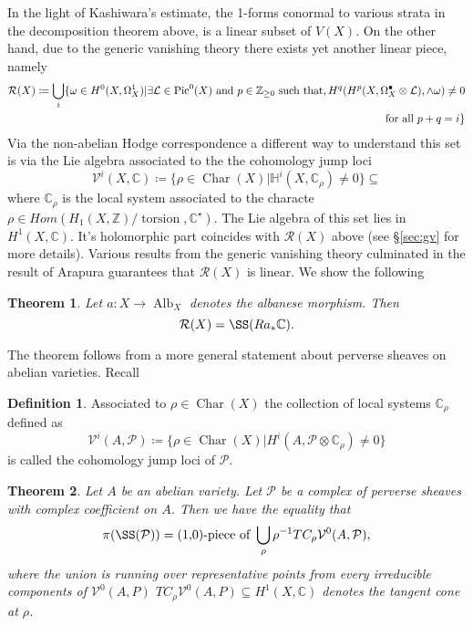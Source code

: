 \documentclass[12pt,reqno]{amsart}
\newtheorem{alphtheorem}{Theorem}
\theoremstyle{question}
\theoremstyle{definition}
\newtheorem{definition}[theorem]{Definition}
\theoremstyle{remark}
\theoremstyle{cited}
\theoremstyle{citeddef}
\DeclareMathOperator{\Alb}{Alb}
\DeclareMathOperator{\Char}{Char}
\def\Pic{{\rm Pic}}
\newcommand{\sL}{\mathcal{L}}
\newcommand{\sP}{\mathcal{P}}
\newcommand{\sR}{\mathcal{R}}
\newcommand\sV{{\mathcal V}}
\newcommand{\bbC}{\mathbb{C}}
\newcommand{\bbH}{\mathbb{H}}
\newcommand{\bbZ}{\mathbb{Z}}
\DeclareMathOperator{\torsion}{torsion}
\begin{document}
In the light of Kashiwara's estimate, the 1-forms
conormal to various strata in the decomposition theorem
above, is a linear subset of $V(X)$. On the other hand,
due to the generic vanishing theory
there exists yet another linear piece, namely
\begin{equation}
\begin{split}
\sR(X)\coloneqq \bigcup_i\{\omega\in H^0(X, \Omega_X^1)| \exists \sL\in \Pic^0(X) \text{ and } p\in \bbZ_{\geq 0} \text{ such that},
H^q(H^{p}(X, \Omega_X^{\bullet}\otimes \sL), \wedge\omega) \neq 0
\\\text{ for all } p+q=i\}
\label{eq:}
\end{split}
\end{equation}
Via the non-abelian Hodge correspondence a different way to understand this set is via the Lie algebra associated to the  the cohomology jump loci 
\[\sV^i(X,\bbC) \coloneqq \{\rho\in\Char(X)| \bbH^i(X, \bbC_{\rho})\neq  0\}\subseteq \]
where $\bbC_{\rho}$ is the local system associated 
to the characte $\rho\in Hom(H_1(X,\bbZ)/\torsion, \bbC^{\star})$.
The Lie algebra of this set lies in $H^1(X,\bbC)$. It's holomorphic part coincides with $\sR(X)$ above
(see \S \ref{sec:gv} for more details). Various results
from the generic vanishing theory culminated in
the result of Arapura \cite[p.\ 311]{Ara92} guarantees that
$\sR(X)$ is linear. 
We show the following
\begin{alphtheorem}
Let $a\colon X\to \Alb_X$ denotes the albanese morphism. Then
\[\sR(X) =  \SS(Ra_*\bbC). \]
\label{thm:linearity}
\end{alphtheorem}


The theorem follows from a more general statement
about perverse sheaves on abelian varieties. Recall
\begin{definition}
Associated to $\rho\in \Char(X)$ the collection of local systems $\bbC_{\rho}$ defined as
\[\sV^i(A, \sP) \coloneqq \{\rho\in\Char(X)| H^i(A, \sP\otimes \bbC_{\rho}) \neq 0\}\]
is called the cohomology jump loci of $\sP$.
\label{def:cjl}
\end{definition}
\begin{alphtheorem}
Let $A$ be an abelian variety. Let $\sP$ be a complex of perverse sheaves with complex coefficient on $A$. 
Then we have the equality that
$$\pi(\SS(\sP)) = \text{(1,0)-piece of }\bigcup_{\rho} \rho^{-1} TC_{\rho} \sV^0(A,\sP), $$
where the union is running over representative points from every irreducible components of $\sV^0(A,P)$
$TC_{\rho} \sV^0(A,P) \subseteq H^1(X, \bbC)$ denotes the tangent cone at $\rho$. 
\label{thm:perverse}
\end{alphtheorem}
\end{document}
